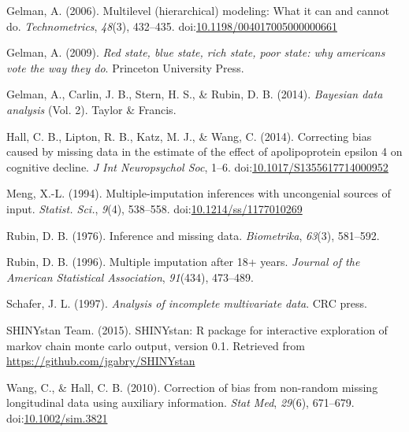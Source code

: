 \documentclass[]{article}
\begin{document}
Gelman, A. (2006). Multilevel (hierarchical) modeling: What it can and
cannot do. \emph{Technometrics}, \emph{48}(3), 432--435.
doi:\href{http://dx.doi.org/10.1198/004017005000000661}{10.1198/004017005000000661}

Gelman, A. (2009). \emph{Red state, blue state, rich state, poor state:
why americans vote the way they do}. Princeton University Press.

Gelman, A., Carlin, J. B., Stern, H. S., \& Rubin, D. B. (2014).
\emph{Bayesian data analysis} (Vol. 2). Taylor \& Francis.

Hall, C. B., Lipton, R. B., Katz, M. J., \& Wang, C. (2014). Correcting
bias caused by missing data in the estimate of the effect of
apolipoprotein epsilon 4 on cognitive decline. \emph{J Int Neuropsychol
Soc}, 1--6.
doi:\href{http://dx.doi.org/10.1017/S1355617714000952}{10.1017/S1355617714000952}

Meng, X.-L. (1994). Multiple-imputation inferences with uncongenial
sources of input. \emph{Statist. Sci.}, \emph{9}(4), 538--558.
doi:\href{http://dx.doi.org/10.1214/ss/1177010269}{10.1214/ss/1177010269}

Rubin, D. B. (1976). Inference and missing data. \emph{Biometrika},
\emph{63}(3), 581--592.

Rubin, D. B. (1996). Multiple imputation after 18+ years. \emph{Journal
of the American Statistical Association}, \emph{91}(434), 473--489.

Schafer, J. L. (1997). \emph{Analysis of incomplete multivariate data}.
CRC press.

SHINYstan Team. (2015). SHINYstan: R package for interactive exploration
of markov chain monte carlo output, version 0.1. Retrieved from
\url{https://github.com/jgabry/SHINYstan}

Wang, C., \& Hall, C. B. (2010). Correction of bias from non-random
missing longitudinal data using auxiliary information. \emph{Stat Med},
\emph{29}(6), 671--679.
doi:\href{http://dx.doi.org/10.1002/sim.3821}{10.1002/sim.3821}
\end{document}
